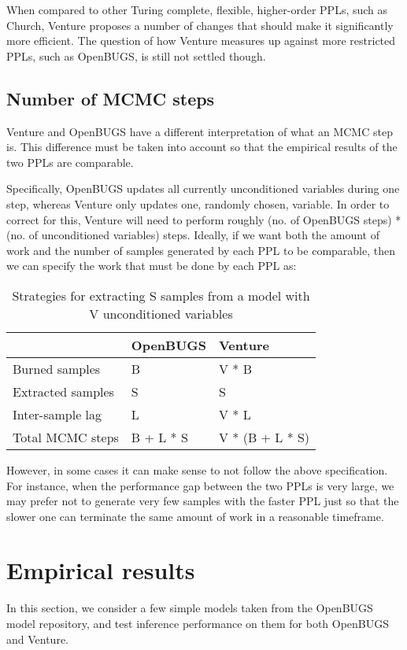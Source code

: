 When compared to other Turing complete, flexible, higher-order PPLs, such as Church, Venture proposes a number of changes that should make it significantly more efficient. The question of how Venture measures up against more restricted PPLs, such as OpenBUGS, is still not settled though. 

\subsection{Number of MCMC steps}
Venture and OpenBUGS have a different interpretation of what an MCMC step is. This difference must be taken into account so that the empirical results of the two PPLs are comparable.

Specifically, OpenBUGS updates all currently unconditioned variables during one step, whereas Venture only updates one, randomly chosen, variable. In order to correct for this, Venture will need to perform roughly (no. of OpenBUGS steps) * (no. of unconditioned variables) steps. Ideally, if we want both the amount of work and the number of samples generated by each PPL to be comparable, then we can specify the work that must be done by each PPL as:

\begin{table}[H]
  \centering
  \begin{tabular}{lll}
    \toprule
    & OpenBUGS & Venture \\
    \midrule
    Burned samples & B & V * B \\
    Extracted samples & S & S \\
    Inter-sample lag & L & V * L \\
    Total MCMC steps & B + L * S & V * (B + L * S) \\
    \bottomrule
  \end{tabular}
  \caption{Strategies for extracting S samples from a model with V unconditioned variables}
  \label{tab:noSteps}
\end{table}

However, in some cases it can make sense to not follow the above specification. For instance, when the performance gap between the two PPLs is very large, we may prefer not to generate very few samples with the faster PPL just so that the slower one can terminate the same amount of work in a reasonable timeframe. 

\section{Empirical results}
In this section, we consider a few simple models taken from the OpenBUGS model repository, and test inference performance on them for both OpenBUGS and Venture.

